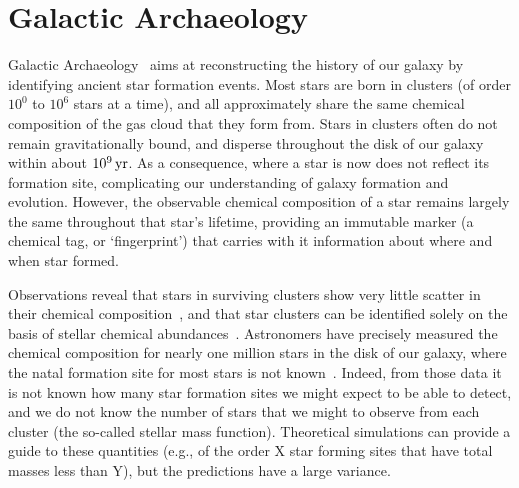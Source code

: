 \documentclass{elsarticle}
\begin{document}
\section{Galactic Archaeology}
Galactic Archaeology~\cite{freeman2002new} aims at reconstructing the history 
of our galaxy by identifying ancient star formation events. Most stars are 
born in clusters (of order $10^0$ to $10^6$ stars at a time), and all approximately
share the same chemical composition of the gas cloud that they form from.
Stars in clusters often do not remain gravitationally bound, and disperse 
throughout the disk of our galaxy within about $10^9\,{\rm yr}$. %
As a consequence, where a star is now does not reflect its formation site, 
complicating our understanding of galaxy formation and evolution. However, the
observable chemical composition of a star remains largely the same throughout
that star's lifetime, providing an immutable marker (a chemical tag, or
`fingerprint') that carries with it information about where and when star
formed.


Observations reveal that stars in surviving clusters show very little scatter
in their chemical composition~\cite{pancino2010chemical}, and that star
clusters can be identified solely on the basis of stellar chemical
abundances~\cite{hogg2016kmeans}. Astronomers have precisely measured the
chemical composition for nearly one million stars in the disk of our galaxy,
where the natal formation site for most stars is not known~\cite{galah}.
Indeed, from those data it is not known how many star formation sites we might
expect to be able to detect, and we do not know the number of stars that we
might to observe from each cluster (the so-called stellar mass function).
Theoretical simulations can provide a guide to these quantities (e.g., of the
order X star forming sites that have total masses less than Y), but the
predictions have a large variance.
\end{document}
